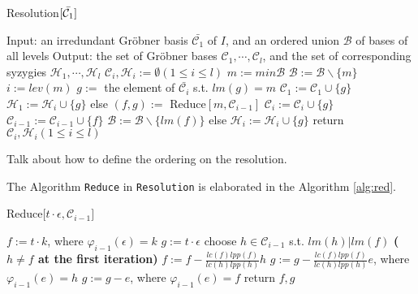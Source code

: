 \documentclass{article}
\theoremstyle{definition}
\theoremstyle{remark}
\theoremstyle{example}
\begin{document}
\begin{algorithm}[H]
\caption{Resolution$[\bar{{\mathcal{C}}\sb{1}}]$}\label{alg:res}
    \begin{algorithmic}
        \State Input: an irredundant Gröbner basis $\bar{{\mathcal{C}}_{1}}$ of $I$, and an ordered union $\mathcal{B}$ of bases of all levels
        \State Output: the set of Gröbner bases $\mathcal{C}_{1},\cdots,\mathcal{C}_{l}$, and the set of corresponding syzygies $\mathcal{H}_{1},\cdots,\mathcal{H}_{l}$
        \newline
        \State ${\mathcal{C}}_{i},{\mathcal{H}}_{i}:=\emptyset (1\leq i\leq l)$
            \State $m:=min\mathcal{B}$
            \State $\mathcal{B}:=\mathcal{B}\backslash\{m\}$
            \State $i:=lev(m)$
                \State $g:=$ the element of $\bar{{\mathcal{C}}_{i}}$ s.t. $lm(g)=m$
                \State ${\mathcal{C}}_{1}:={\mathcal{C}}_{1}\cup\{g\}$
                \State ${\mathcal{H}}_{1}:={\mathcal{H}}_{i}\cup\{g\}$
            \State else
                \State $(f,g):=$ Reduce$[m,{\mathcal{C}}_{i-1}]$
                \State ${\mathcal{C}}_{i}:={\mathcal{C}}_{i}\cup\{g\}$
                    \State ${\mathcal{C}}_{i-1}:={\mathcal{C}}_{i-1}\cup\{f\}$
                    \State $\mathcal{B}:=\mathcal{B}\backslash\{lm(f)\}$
                \State else
                    \State ${\mathcal{H}}_{i}:={\mathcal{H}}_{i}\cup\{g\}$
                \EndIf
            \EndIf
        \EndWhile
        \State return ${\mathcal{C}}_{i},{\mathcal{H}}_{i}(1\leq i\leq l)$
        \end{algorithmic}
\end{algorithm}

\textcolor{BrickRed}{Talk about how to define the ordering on the resolution.}

The Algorithm \verb+Reduce+ in \verb+Resolution+ is elaborated in the Algorithm \ref{alg:red}.

\begin{algorithm}[H]
\caption{Reduce[$t\cdot \epsilon,\mathcal{C}_{i-1}]$}\label{alg:red}
    \begin{algorithmic}
    \State $f:=t\cdot k$, where $\varphi_{i-1}(\epsilon) = k$
    \State $g:=t\cdot \epsilon$
        \State choose  $h \in \mathcal{C}_{i-1}$ s.t. $lm(h)\vert lm(f)$  \textbf{($h \neq f$ at the first iteration)}
        \State $f := f - \tfrac{lc(f)lpp(f)}{lc(h)lpp(h)}h$
        \State $g := g - \tfrac{lc(f)lpp(f)}{lc(h)lpp(h)}e$, where $\varphi_{i-1}(e) = h$
    \EndWhile
        \State $g := g - e$, where $\varphi_{i-1}(e) = f$
    \EndIf
    \State return $f,g$
    \end{algorithmic}
\end{algorithm}
\end{document}
